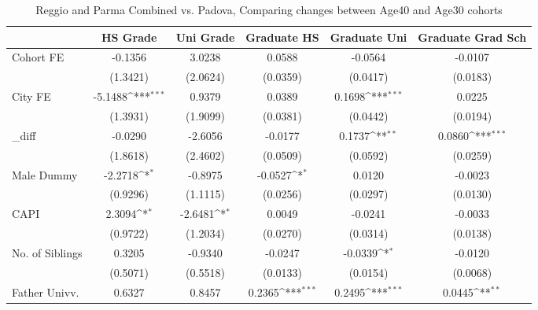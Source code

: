 \begin{table}[htbp]\centering
\def\sym#1{\ifmmode^{#1}\else\(^{#1}\)\fi}
\caption{Reggio and Parma Combined vs. Padova, Comparing changes between Age40 and Age30 cohorts}
\begin{tabular}{l*{5}{c}}
\toprule
            &\multicolumn{1}{c}{HS Grade}&\multicolumn{1}{c}{Uni Grade}&\multicolumn{1}{c}{Graduate HS}&\multicolumn{1}{c}{Graduate Uni}&\multicolumn{1}{c}{Graduate Grad Sch}\\
\midrule
Cohort FE   &     -0.1356         &      3.0238         &      0.0588         &     -0.0564         &     -0.0107         \\
            &    (1.3421)         &    (2.0624)         &    (0.0359)         &    (0.0417)         &    (0.0183)         \\
\addlinespace
City FE     &     -5.1488\sym{***}&      0.9379         &      0.0389         &      0.1698\sym{***}&      0.0225         \\
            &    (1.3931)         &    (1.9099)         &    (0.0381)         &    (0.0442)         &    (0.0194)         \\
\addlinespace
\_diff       &     -0.0290         &     -2.6056         &     -0.0177         &      0.1737\sym{**} &      0.0860\sym{***}\\
            &    (1.8618)         &    (2.4602)         &    (0.0509)         &    (0.0592)         &    (0.0259)         \\
\addlinespace
Male Dummy  &     -2.2718\sym{*}  &     -0.8975         &     -0.0527\sym{*}  &      0.0120         &     -0.0023         \\
            &    (0.9296)         &    (1.1115)         &    (0.0256)         &    (0.0297)         &    (0.0130)         \\
\addlinespace
CAPI        &      2.3094\sym{*}  &     -2.6481\sym{*}  &      0.0049         &     -0.0241         &     -0.0033         \\
            &    (0.9722)         &    (1.2034)         &    (0.0270)         &    (0.0314)         &    (0.0138)         \\
\addlinespace
No. of Siblings&      0.3205         &     -0.9340         &     -0.0247         &     -0.0339\sym{*}  &     -0.0120         \\
            &    (0.5071)         &    (0.5518)         &    (0.0133)         &    (0.0154)         &    (0.0068)         \\
\addlinespace
Father Univv.&      0.6327         &      0.8457         &      0.2365\sym{***}&      0.2495\sym{***}&      0.0445\sym{**} \\

\end{tabular}
\end{table}
